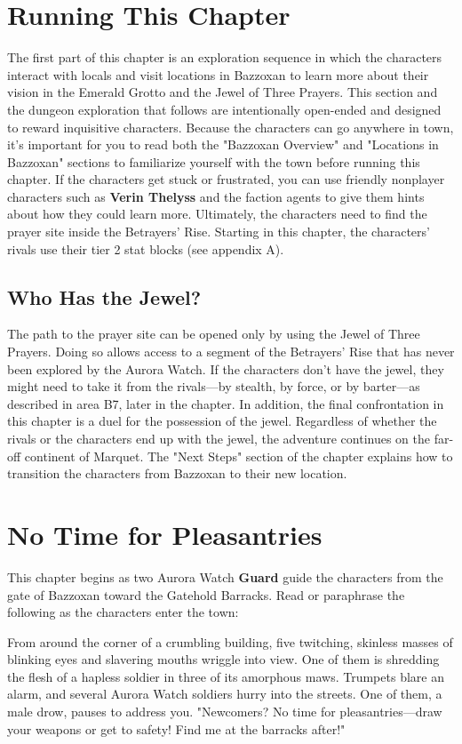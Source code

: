 \documentclass[10pt,a4,twoside,twocolumn,openany,nodeprecatedcode]{dndbook}
\begin{document}
\section{Running This Chapter}
The first part of this chapter is an exploration sequence in which the characters interact with locals and visit locations in Bazzoxan to learn more about their vision in the Emerald Grotto and the Jewel of Three Prayers. This section and the dungeon exploration that follows are intentionally open-ended and designed to reward inquisitive characters.
Because the characters can go anywhere in town, it's important for you to read both the "Bazzoxan Overview" and "Locations in Bazzoxan" sections to familiarize yourself with the town before running this chapter.
If the characters get stuck or frustrated, you can use friendly nonplayer characters such as \textbf{Verin Thelyss} and the faction agents to give them hints about how they could learn more. Ultimately, the characters need to find the prayer site inside the Betrayers' Rise.
Starting in this chapter, the characters' rivals use their tier 2 stat blocks (see appendix A).
\subsection{Who Has the Jewel?}
The path to the prayer site can be opened only by using the Jewel of Three Prayers. Doing so allows access to a segment of the Betrayers' Rise that has never been explored by the Aurora Watch. If the characters don't have the jewel, they might need to take it from the rivals—by stealth, by force, or by barter—as described in area B7, later in the chapter.
In addition, the final confrontation in this chapter is a duel for the possession of the jewel. Regardless of whether the rivals or the characters end up with the jewel, the adventure continues on the far-off continent of Marquet. The "Next Steps" section of the chapter explains how to transition the characters from Bazzoxan to their new location.
\section{No Time for Pleasantries}
This chapter begins as two Aurora Watch \textbf{Guard} guide the characters from the gate of Bazzoxan toward the Gatehold Barracks. Read or paraphrase the following as the characters enter the town:
\begin{DndReadAloud}{}
From around the corner of a crumbling building, five twitching, skinless masses of blinking eyes and slavering mouths wriggle into view. One of them is shredding the flesh of a hapless soldier in three of its amorphous maws. Trumpets blare an alarm, and several Aurora Watch soldiers hurry into the streets. One of them, a male drow, pauses to address you. "Newcomers? No time for pleasantries—draw your weapons or get to safety! Find me at the barracks after!"
\end{DndReadAloud}
\end{document}
